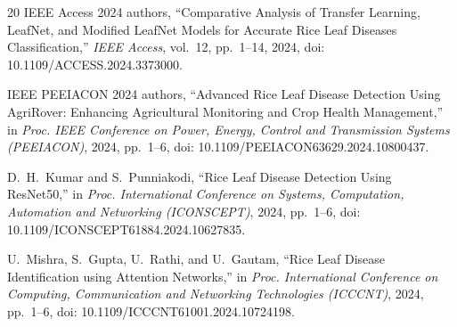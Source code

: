 \documentclass[conference]{IEEEtran}
\begin{document}
\begin{thebibliography}{20}
 IEEE Access 2024 authors, ``Comparative Analysis of Transfer Learning, LeafNet, and Modified LeafNet Models for Accurate Rice Leaf Diseases Classification,'' \textit{IEEE Access}, vol.~12, pp.~1--14, 2024, doi: 10.1109/ACCESS.2024.3373000.

 IEEE PEEIACON 2024 authors, ``Advanced Rice Leaf Disease Detection Using AgriRover: Enhancing Agricultural Monitoring and Crop Health Management,'' in \textit{Proc. IEEE Conference on Power, Energy, Control and Transmission Systems (PEEIACON)}, 2024, pp.~1--6, doi: 10.1109/PEEIACON63629.2024.10800437.

 D.~H.~Kumar and S.~Punniakodi, ``Rice Leaf Disease Detection Using ResNet50,'' in \textit{Proc. International Conference on Systems, Computation, Automation and Networking (ICONSCEPT)}, 2024, pp.~1--6, doi: 10.1109/ICONSCEPT61884.2024.10627835.

 U.~Mishra, S.~Gupta, U.~Rathi, and U.~Gautam, ``Rice Leaf Disease Identification using Attention Networks,'' in \textit{Proc. International Conference on Computing, Communication and Networking Technologies (ICCCNT)}, 2024, pp.~1--6, doi: 10.1109/ICCCNT61001.2024.10724198.

\end{thebibliography}
\end{document}
